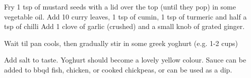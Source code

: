\vfill
\pagebreak



Fry 1 tsp of mustard seeds with a lid over the top  (until they pop) in some vegetable oil. 
Add 10 curry leaves, 1 tsp of cumin, 1 tsp of turmeric and half a tsp of chilli 
Add 1 clove of garlic (crushed) and a small knob of grated ginger. 

Wait til pan cools, then gradually stir in some greek yoghurt (e.g. 1-2 cups)

Add salt to taste. Yoghurt should become a lovely yellow colour. Sauce can be added to bbqd fish, chicken, or cooked chickpeas, or can be used as a dip. 